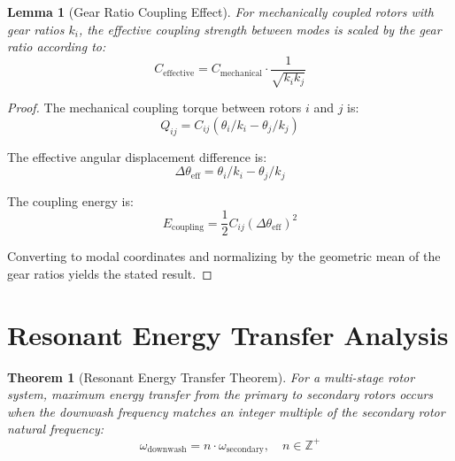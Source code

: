 \documentclass{article}
\newtheorem{theorem}{Theorem}
\newtheorem{lemma}{Lemma}
\begin{document}
\begin{lemma}[Gear Ratio Coupling Effect]
For mechanically coupled rotors with gear ratios $k_i$, the effective coupling strength between modes is scaled by the gear ratio according to:
\begin{equation}
C_{\text{effective}} = C_{\text{mechanical}} \cdot \frac{1}{\sqrt{k_i k_j}}
\end{equation}
\end{lemma}

\begin{proof}
The mechanical coupling torque between rotors $i$ and $j$ is:
$$Q_{ij} = C_{ij}(\theta_i/k_i - \theta_j/k_j)$$

The effective angular displacement difference is:
$$\Delta\theta_{\text{eff}} = \theta_i/k_i - \theta_j/k_j$$

The coupling energy is:
$$E_{\text{coupling}} = \frac{1}{2}C_{ij}(\Delta\theta_{\text{eff}})^2$$

Converting to modal coordinates and normalizing by the geometric mean of the gear ratios yields the stated result.
\end{proof}

\section{Resonant Energy Transfer Analysis}

\begin{theorem}[Resonant Energy Transfer Theorem]
For a multi-stage rotor system, maximum energy transfer from the primary to secondary rotors occurs when the downwash frequency matches an integer multiple of the secondary rotor natural frequency:
\begin{equation}
\omega_{\text{downwash}} = n \cdot \omega_{\text{secondary}}, \quad n \in \mathbb{Z}^+
\end{equation}
\end{theorem}
\end{document}
